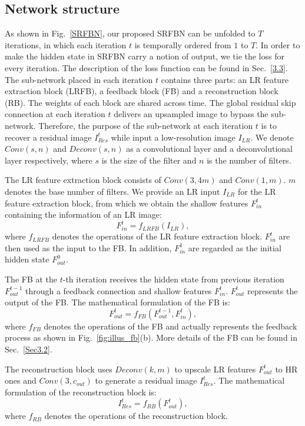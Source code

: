 \documentclass[10pt,twocolumn,letterpaper]{article}
\begin{document}
	\subsection{Network structure}
	As shown in Fig.~\ref{SRFBN}, our proposed SRFBN can be unfolded to $T$ iterations, in which each iteration $t$ is temporally ordered from $1$ to $T$. In order to make the hidden state in SRFBN carry a notion of output, we tie the loss for every iteration. The description of the loss function can be found in Sec.~\ref{3.3}. The sub-network placed in each iteration $t$ contains three parts: an LR feature extraction block (LRFB), a feedback block (FB) and a reconstruction block (RB). The weights of each block are shared across time. The global residual skip connection at each iteration $t$ delivers an upsampled image to bypass the sub-network. Therefore, the purpose of the sub-network at each iteration $t$ is to recover a residual image $I_{Res}^{t}$ while input a low-resolution image $I_{LR}$. We denote $Conv(s,n)$ and $Deconv(s,n)$ as a convolutional layer and a deconvolutional layer respectively, where $s$ is the size of the filter and $n$ is the number of filters. 
	
	The LR feature extraction block consists of $Conv(3,4m)$ and $Conv(1,m)$. $m$ denotes the base number of filters. We provide an LR input $I_{LR}$ for the LR feature extraction block, from which we obtain the shallow features $F_{in}^{t}$ containing the information of an LR image:
	\begin{equation}
	F_{in}^{t} = f_{LRFB}(I_{LR}),
	\end{equation}
	where $f_{LRFB}$ denotes the operations of the LR feature extraction block. $F_{in}^{t}$ are then used as the input to the FB. In addition, $F_{in}^{1}$ are regarded as the initial hidden state $F_{out}^{0}$.
	
	The FB at the $t$-th iteration receives the hidden state from previous iteration $F_{out}^{t-1}$ through a feedback connection and shallow features $F_{in}^{t}$. $F_{out}^{t}$ represents the output of the FB. The mathematical formulation of the FB is:	
	\begin{equation}
	F_{out}^{t} = f_{FB}(F_{out}^{t-1},F_{in}^{t}),
	\end{equation}
	where $f_{FB}$ denotes the operations of the FB and actually represents the feedback process as shown in Fig.~\ref{fig:illus_fb}(b). More details of the FB can be found in Sec.~\ref{Sec3.2}. 
	
	 The reconstruction block uses $Deconv(k,m)$ to upscale LR features $F_{out}^{t}$ to HR ones and $Conv(3,c_{out})$ to generate a residual image $I_{Res}^{t}$. The mathematical formulation of the reconstruction block is:
	\begin{equation}
	I_{Res}^{t} = f_{RB}(F_{out}^{t}),
	\end{equation}
	where $f_{RB}$ denotes the operations of the reconstruction block. 
	
\end{document}
